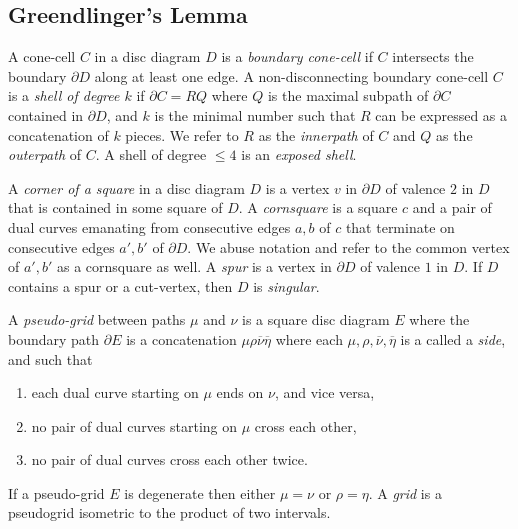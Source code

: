 \documentclass[12pt,oneside]{amsart}
\theoremstyle{definition}
\theoremstyle{definition}
\theoremstyle{remark}
\begin{document}
\subsection{Greendlinger's Lemma}
A cone-cell $C$ in a disc diagram $D$ is a \emph{boundary cone-cell} if $C$ intersects the boundary $\partial D$ along at least one edge. A non-disconnecting boundary cone-cell $C$ is a \emph{shell of degree $k$} if  $\partial C = RQ$ where 
$Q$ is the maximal subpath of $\partial C$ contained in $\partial D$, and $k$ is the minimal number such that $R$ can be expressed as a concatenation of $k$ pieces. We refer to $R$ as the \emph{innerpath} of $C$ and $Q$ as the \emph{outerpath} of $C$. A shell  of degree $\leq 4$ is an \emph{exposed shell}.

A \emph{corner of a square} in a disc diagram $D$ is a vertex $v$ in $\partial D$ of valence $2$ in $D$ that is contained in some square of $D$. 
A \emph{cornsquare} is a square $c$ and  a pair of dual curves emanating from consecutive edges $a, b$ of $c$ that terminate on consecutive edges $a',b'$ of $\partial D$. We abuse  notation and refer to the common vertex of $a',b'$ as a cornsquare as well.
A \emph{spur} is a vertex in $\partial D$ of valence $1$ in $D$. If $D$ contains a spur or a cut-vertex, then $D$ is \emph{singular}.


A \emph{pseudo-grid} between paths $\mu$ and $\nu$ is a square disc diagram $E$ where the boundary path $\partial E$ is a concatenation $\mu \rho \overline{\nu} \overline{\eta}$ where each $\mu, \rho, \overline{\nu}, \overline{\eta}$ is a called a \emph{side}, and  such that 
\begin{enumerate}
\item each dual curve starting on $\mu$ ends on $\nu$, and vice versa, 
\item no pair of dual curves starting on $\mu$ cross each other,
\item no pair of dual curves cross each other twice.
\end{enumerate}
If a pseudo-grid $E$ is degenerate then either $\mu = \nu$ or $\rho= \eta$. A \emph{grid} is a pseudogrid isometric to
the product of two intervals. 
\end{document}
